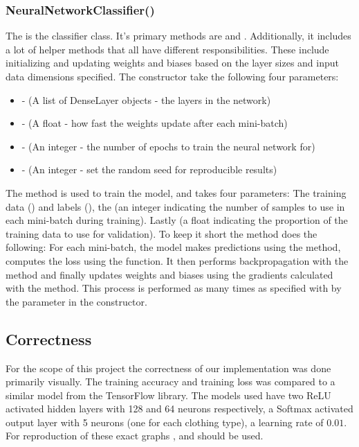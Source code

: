 \subsubsection{NeuralNetworkClassifier()}
The  is the classifier class.
It's primary methods are  and .
Additionally, it includes a lot of helper methods that all have different responsibilities.
These include initializing and updating weights and biases based on the layer sizes and input data dimensions specified.
The constructor take the following four parameters:\\
\begin{itemize}
    \item {} - (A list of DenseLayer objects - the layers in the network)
    \item {} - (A float - how fast the weights update after each mini-batch)
    \item {} - (An integer - the number of epochs to train the neural network for)
    \item {} - (An integer - set the random seed for reproducible results)
    \end{itemize}
\vspace{10pt}


The  method is used to train the model, and takes four parameters:
The training data () and labels (), the  (an integer indicating the number of samples to use in each mini-batch during training).
Lastly  (a float indicating the proportion of the training data to use for validation).
To keep it short the  method does the following:
For each mini-batch, the model makes predictions using the  method, computes the loss using the  function.
It then performs backpropagation with the  method and finally updates weights and biases using the gradients calculated with the  method.
This process is performed as many times as specified with by the  parameter in the constructor.

\subsection{Correctness}
For the scope of this project the correctness of our implementation was done primarily visually.
The training accuracy and training loss was compared to a similar model from the TensorFlow library.
The models used have two ReLU activated hidden layers with 128 and 64 neurons respectively, a Softmax activated output layer with 5 neurons (one for each clothing type), a learning rate of $0.01$.
For reproduction of these exact graphs , and  should be used. \\

